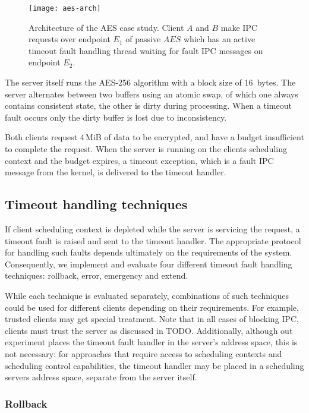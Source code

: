 \begin{figure}
\centering
\texttt{[image: aes-arch]}
\caption{Architecture of the \gls{AES} case study. Client $A$ and $B$ make \gls{IPC} requests over
endpoint $E_{1}$ of passive $AES$ which has an active timeout fault handling thread waiting for
fault \gls{IPC} messages on endpoint $E_{2}$.}
\label{f:aes-arch}
\end{figure}

The server itself runs the AES-256 algorithm with a block size of 16~bytes. The server alternates between two
buffers using an atomic swap, of which one always contains consistent state, the other is
dirty during processing. When a timeout fault occurs only the dirty buffer is lost due to
inconsistency. 

Both clients request 4\,MiB of data to be encrypted, and have a budget insufficient to
complete the request. When the server is running on the clients scheduling context and the budget
expires, a timeout exception, which is a fault IPC message from the kernel, is delivered to the timeout
handler. 

\subsection{Timeout handling techniques}

If client scheduling context is depleted while the server is servicing the request, a timeout fault is raised and
sent to the timeout handler.
The appropriate protocol for handling such faults depends ultimately on the requirements of the system.
Consequently, we implement and evaluate four different timeout fault handling techniques: rollback, error,
emergency and extend. 

While each technique is evaluated separately, combinations of such techniques could be used for
different clients depending on their requirements. For example, trusted clients may get special
treatment. Note that in all cases of blocking IPC, clients must trust the server as discussed in
TODO. Additionally, although out experiment places the timeout fault handler in the server's address
space, this is not necessary: for approaches that require access to scheduling contexts and
scheduling control capabilities, the timeout handler may be placed in a scheduling servers address
space, separate from the server itself.

\subsubsection{Rollback}

